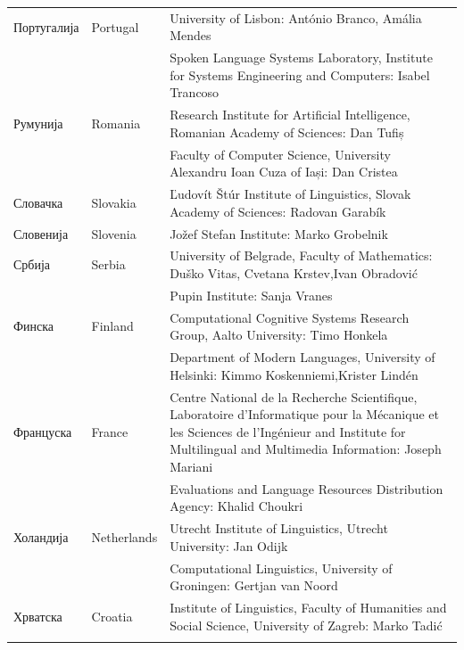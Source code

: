 \begin{longtable}{llp{114mm}}
  Португалија & \textcolor{grey1}{Portugal} & University of Lisbon: António Branco, Amália Mendes \\ \addlinespace
  & & Spoken Language Systems Laboratory, Institute for Systems Engineering and Computers: Isabel Trancoso \\ \addlinespace
  Румунија & \textcolor{grey1}{Romania} & Research Institute for Artificial Intelligence, Romanian Academy of Sciences: Dan Tufiș \\ \addlinespace
  & & Faculty of Computer Science, University Alexandru Ioan Cuza of Iași: Dan Cristea \\ \addlinespace
  Словачка & \textcolor{grey1}{Slovakia} & Ľudovít Štúr Institute of Linguistics, Slovak Academy of Sciences: Radovan Garabík \\ \addlinespace 
  Словенија & \textcolor{grey1}{Slovenia} & Jožef Stefan Institute: Marko Grobelnik \\ \addlinespace 
  Србија & \textcolor{grey1}{Serbia} & University of Belgrade, Faculty of Mathematics: Duško Vitas, Cvetana Krstev,\newline Ivan Obradović \\ \addlinespace
  & & Pupin Institute: Sanja Vranes \\ \addlinespace  
  Финска & \textcolor{grey1}{Finland} & Computational Cognitive Systems Research Group, Aalto University: Timo Honkela\\ \addlinespace
  & & Department of Modern Languages, University of Helsinki: Kimmo Koskenniemi,\newline Krister Lindén \\ \addlinespace
  Француска & \textcolor{grey1}{France} & Centre National de la Recherche Scientifique, Laboratoire d'Informatique pour la Mécanique et les Sciences de l'Ingénieur and Institute for Multilingual and Multimedia Information: Joseph Mariani \\ \addlinespace
  & & Evaluations and Language Resources Distribution Agency: Khalid Choukri\\ \addlinespace
  Холандија &  \textcolor{grey1}{Netherlands} & Utrecht Institute of Linguistics, Utrecht University: Jan Odijk\\ \addlinespace 
  & & Computational Linguistics, University of Groningen: Gertjan van Noord\\ \addlinespace
  Хрватска & \textcolor{grey1}{Croatia} & Institute of Linguistics, Faculty of Humanities and Social Science, University of Zagreb: Marko Tadić \\ \addlinespace 

\end{longtable}

